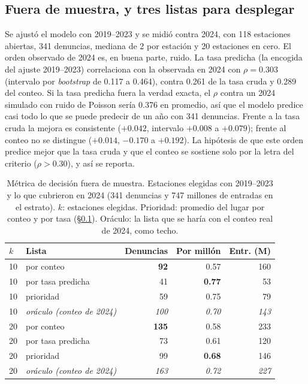 \documentclass[conference]{IEEEtran}
\begin{document}
\subsection{Fuera de muestra, y tres listas para desplegar}
\label{sec:listas}

Se ajustó el modelo con 2019--2023 y se midió contra 2024, con 118 estaciones abiertas, 341 denuncias, mediana de 2 por estación y 20 estaciones en cero. El orden observado de 2024 es, en buena parte, ruido. La tasa predicha (la encogida del ajuste 2019--2023) correlaciona con la observada en 2024 con $\rho = 0.303$ (intervalo por \emph{bootstrap} de 0.117 a 0.464), contra 0.261 de la tasa cruda y 0.289 del conteo. Si la tasa predicha fuera la verdad exacta, el $\rho$ contra un 2024 simulado con ruido de Poisson sería 0.376 en promedio, así que el modelo predice casi todo lo que se puede predecir de un año con 341 denuncias. Frente a la tasa cruda la mejora es consistente ($+0.042$, intervalo $+0.008$ a $+0.079$); frente al conteo no se distingue ($+0.014$, $-0.170$ a $+0.192$). La hipótesis de que este orden predice mejor que la tasa cruda y que el conteo se sostiene solo por la letra del criterio ($\rho > 0.30$), y así se reporta.

\begin{table}[t]
\centering
\caption{Métrica de decisión fuera de muestra. Estaciones elegidas con 2019--2023 y lo que cubrieron en 2024 (341 denuncias y 747 millones de entradas en el estrato). $k$: estaciones elegidas. Prioridad: promedio del lugar por conteo y por tasa (§\ref{sec:listas}). Oráculo: la lista que se haría con el conteo real de 2024, como techo.}
\label{tab:cobertura}
\small\setlength\tabcolsep{3pt}
\begin{tabular}{@{}llrrr@{}}
\toprule
$k$ & Lista & Denuncias & Por millón & Entr. (M) \\
\midrule
10 & por conteo & \textbf{92} & 0.57 & 160 \\
10 & por tasa predicha & 41 & \textbf{0.77} & 53 \\
10 & prioridad & 59 & 0.75 & 79 \\
10 & \emph{oráculo (conteo de 2024)} & \emph{100} & \emph{0.70} & \emph{143} \\
\midrule
20 & por conteo & \textbf{135} & 0.58 & 233 \\
20 & por tasa predicha & 73 & 0.61 & 120 \\
20 & prioridad & 99 & \textbf{0.68} & 146 \\
20 & \emph{oráculo (conteo de 2024)} & \emph{163} & \emph{0.72} & \emph{227} \\
\bottomrule
\end{tabular}
\end{table}
\end{document}

